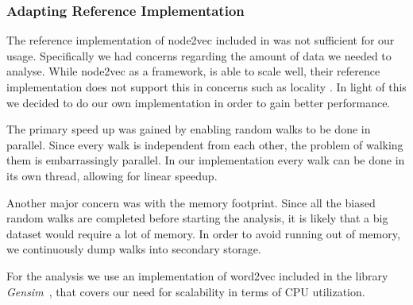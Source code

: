 \subsubsection{Adapting Reference Implementation}
The reference implementation of node2vec included in \cite{node2vec} was not sufficient for our usage. Specifically we had concerns regarding the amount of data we needed to analyse. While node2vec as a framework, is able to scale well, their reference implementation does not support this in concerns such as locality . In light of this we decided to do our own implementation in order to gain better performance.

The primary speed up was gained by enabling random walks to be done in parallel. Since every walk is independent from each other, the problem of walking them is embarrassingly parallel. In our implementation every walk can be done in its own thread, allowing for linear speedup.


Another major concern was with the memory footprint. Since all the biased random walks are completed before starting the analysis, it is likely that a big dataset would require a lot of memory. In order to avoid running out of memory, we continuously dump walks into secondary storage.

For the analysis we use an implementation of word2vec included in the library \emph{Gensim}~\cite{rehurek_lrec}, that covers our need for scalability in terms of CPU utilization.
